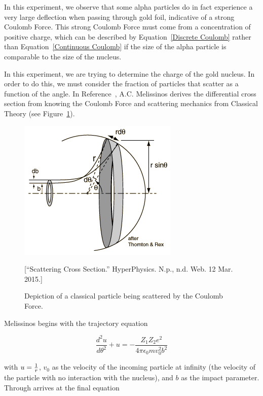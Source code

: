 In this experiment, we observe that some alpha particles do in fact experience a very large deflection when passing through gold foil, indicative of a strong Coulomb Force. This strong Coulomb Force must come from a concentration of positive charge, which can be described by Equation~\ref{Discrete Coulomb} rather than Equation~\ref{Continuous Coulomb} if the size of the alpha particle is comparable to the size of the nucleus. 

In this experiment, we are trying to determine the charge of the gold nucleus. In order to do this, we must consider the fraction of particles that scatter as a function of the angle. In Reference~\cite{Melissinos}, A.C. Melissinos derives the differential cross section from knowing the Coulomb Force and scattering mechanics from Classical Theory (see Figure~\ref{ScatteringTheory}). 

\begin{figure}[h]
  \includegraphics[scale=0.6]{ruthcross.png}
  \begin{center}
  \caption{Depiction of a classical particle being scattered by the Coulomb Force.}[\footnotesize{``Scattering Cross Section.'' HyperPhysics. N.p., n.d. Web. 12 Mar. 2015.}]
  \label{ScatteringTheory}
  \end{center}
\end{figure}

Melissinos begins with the trajectory equation

\begin{equation}
  \frac{d^{2}u}{d\theta^{2}}+u=-\frac{Z_{1}Z_{2}e^{2}}{4\pi\epsilon_{0}mv_{0}^{2}b^{2}}
  \label{StartDerivation}
\end{equation}

with $u={1 \over r}$, $v_0$ as the velocity of the incoming particle at infinity (the velocity of the particle with no interaction with the nucleus), and $b$ as the impact parameter. Through arrives at the final equation 


